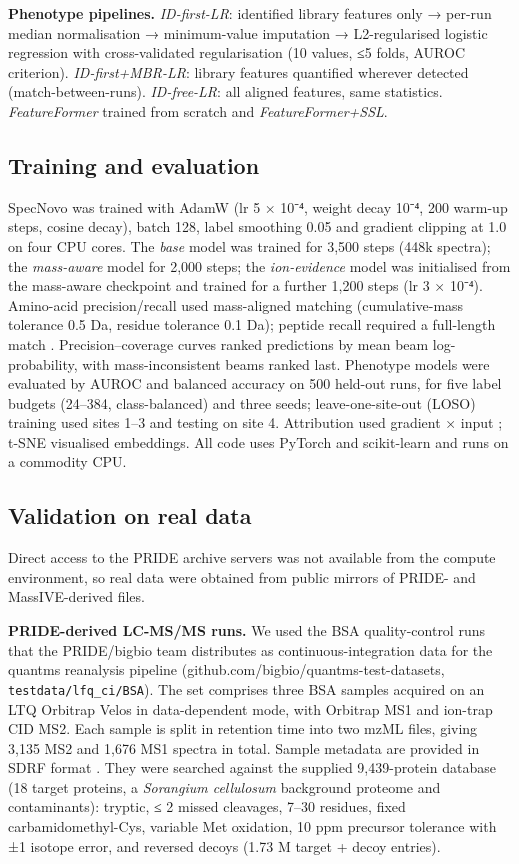 \documentclass[pdflatex,sn-mathphys-num]{sn-jnl}
\begin{document}
\textbf{Phenotype pipelines.} \emph{ID-first-LR}: identified library features only → per-run median normalisation → minimum-value imputation → L2-regularised logistic regression with cross-validated regularisation (10 values, ≤5 folds, AUROC criterion). \emph{ID-first+MBR-LR}: library features quantified wherever detected (match-between-runs). \emph{ID-free-LR}: all aligned features, same statistics. \emph{FeatureFormer} trained from scratch and \emph{FeatureFormer+SSL}.

\subsection{Training and evaluation}

SpecNovo was trained with AdamW (lr 5 × 10⁻⁴, weight decay 10⁻⁴, 200 warm-up steps, cosine decay), batch 128, label smoothing 0.05 and gradient clipping at 1.0 on four CPU cores. The \emph{base} model was trained for 3,500 steps (448k spectra); the \emph{mass-aware} model for 2,000 steps; the \emph{ion-evidence} model was initialised from the mass-aware checkpoint and trained for a further 1,200 steps (lr 3 × 10⁻⁴). Amino-acid precision/recall used mass-aligned matching (cumulative-mass tolerance 0.5 Da, residue tolerance 0.1 Da); peptide recall required a full-length match \cite{yilmaz2024,tran2017}. Precision--coverage curves ranked predictions by mean beam log-probability, with mass-inconsistent beams ranked last. Phenotype models were evaluated by AUROC and balanced accuracy on 500 held-out runs, for five label budgets (24--384, class-balanced) and three seeds; leave-one-site-out (LOSO) training used sites 1--3 and testing on site 4. Attribution used gradient × input \cite{shrikumar2017}; t-SNE \cite{maaten2008} visualised embeddings. All code uses PyTorch \cite{paszke2019} and scikit-learn \cite{pedregosa2011} and runs on a commodity CPU.

\subsection{Validation on real data}

Direct access to the PRIDE archive servers was not available from the compute environment, so real data were obtained from public mirrors of PRIDE- and MassIVE-derived files.

\textbf{PRIDE-derived LC-MS/MS runs.} We used the BSA quality-control runs that the PRIDE/bigbio team distributes as continuous-integration data for the quantms reanalysis pipeline \cite{dai2024} (github.com/bigbio/quantms-test-datasets, \texttt{testdata/lfq\_ci/BSA}). The set comprises three BSA samples acquired on an LTQ Orbitrap Velos in data-dependent mode, with Orbitrap MS1 and ion-trap CID MS2. Each sample is split in retention time into two mzML files, giving 3,135 MS2 and 1,676 MS1 spectra in total. Sample metadata are provided in SDRF format \cite{dai2021}. They were searched against the supplied 9,439-protein database (18 target proteins, a \emph{Sorangium cellulosum} background proteome and contaminants): tryptic, ≤ 2 missed cleavages, 7--30 residues, fixed carbamidomethyl-Cys, variable Met oxidation, 10 ppm precursor tolerance with ±1 isotope error, and reversed decoys (1.73 M target + decoy entries).
\end{document}
